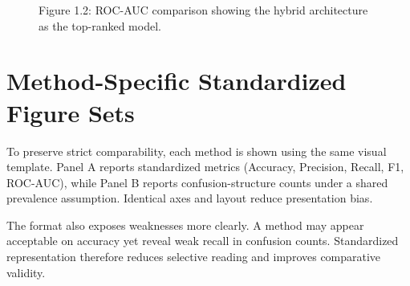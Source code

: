 \documentclass[12pt,a4paper]{report}
\begin{document}
\begin{figure}[H]
\centering
{}
\caption{Figure 1.2: ROC-AUC comparison showing the hybrid architecture as the top-ranked model.}
\label{fig:global_roc}
\end{figure}

\section{Method-Specific Standardized Figure Sets}
To preserve strict comparability, each method is shown using the same visual template. Panel A reports standardized metrics (Accuracy, Precision, Recall, F1, ROC-AUC), while Panel B reports confusion-structure counts under a shared prevalence assumption. Identical axes and layout reduce presentation bias.

The format also exposes weaknesses more clearly. A method may appear acceptable on accuracy yet reveal weak recall in confusion counts. Standardized representation therefore reduces selective reading and improves comparative validity.
\end{document}
